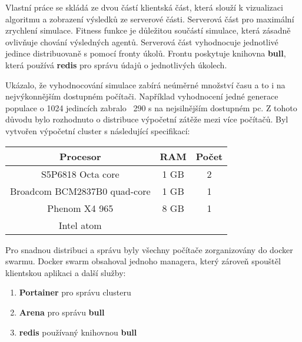 Vlastní práce se skládá ze dvou částí klientská část, která slouží k vizualizaci algoritmu a zobrazení výsledků ze serverové části. Serverová část pro maximální zrychlení simulace. 
Fitness funkce je důležitou součástí simulace, která zásadně ovlivňuje chování výsledných agentů.
Serverová část vyhodnocuje jednotlivé jedince distribuovaně s pomocí fronty úkolů. Frontu poskytuje knihovna \textbf{bull}, která používá \textbf{redis} pro správu údajů o jednotlivých úkolech.

Ukázalo, že vyhodnocování simulace zabírá neúměrné množství času a to i na nejvýkonnějším dostupném počítači. 
Například vyhodnocení jedné generace populace o 1024 jedincích zabralo ~290 s na nejsilnějším dostupném pc. Z tohoto důvodu bylo rozhodnuto o distribuce výpočetní zátěže mezi více počítačů. Byl vytvořen výpočetní cluster s následující specifikací:

\begin{tabular}{|c|c|c|}
	\hline 
	Procesor & RAM & Počet \\ 
	\hline 
	S5P6818 Octa core & 1 GB & 2 \\ 
	\hline 
	Broadcom BCM2837B0 quad-core & 1 GB & 1 \\ 
	\hline 
	Phenom X4 965 & 8 GB & 1 \\ 
	\hline 
	Intel atom &  &  \\ 
	\hline 
\end{tabular} 

Pro snadnou distribuci a správu byly všechny počítače zorganizovány do docker swarmu. Docker swarm obsahoval jednoho managera, který zároveň spouštěl klientskou aplikaci a další služby:

\begin{enumerate}
	\item \textbf{Portainer} pro správu clusteru
	\item \textbf{Arena} pro správu \textbf{bull}
	\item \textbf{redis} používaný knihovnou \textbf{bull}
\end{enumerate}

